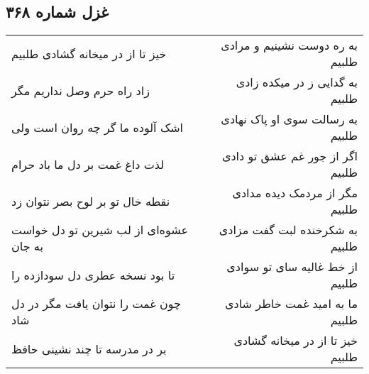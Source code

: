 \begin{center}
\section*{غزل شماره ۳۶۸}
\label{sec:sh368}
\begin{longtable}{l p{0.5cm} r}
خیز تا از در میخانه گشادی طلبیم
&&
به ره دوست نشینیم و مرادی طلبیم
\\
زاد راه حرم وصل نداریم مگر
&&
به گدایی ز در میکده زادی طلبیم
\\
اشک آلوده ما گر چه روان است ولی
&&
به رسالت سوی او پاک نهادی طلبیم
\\
لذت داغ غمت بر دل ما باد حرام
&&
اگر از جور غم عشق تو دادی طلبیم
\\
نقطه خال تو بر لوح بصر نتوان زد
&&
مگر از مردمک دیده مدادی طلبیم
\\
عشوه‌ای از لب شیرین تو دل خواست به جان
&&
به شکرخنده لبت گفت مزادی طلبیم
\\
تا بود نسخه عطری دل سودازده را
&&
از خط غالیه سای تو سوادی طلبیم
\\
چون غمت را نتوان یافت مگر در دل شاد
&&
ما به امید غمت خاطر شادی طلبیم
\\
بر در مدرسه تا چند نشینی حافظ
&&
خیز تا از در میخانه گشادی طلبیم
\\
\end{longtable}
\end{center}
